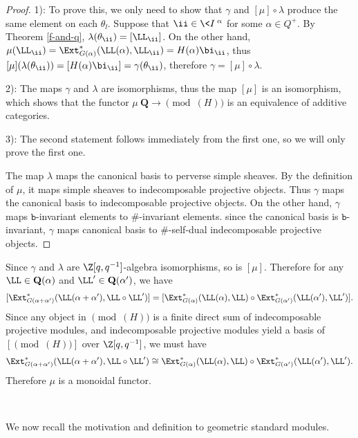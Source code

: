 \begin{proof}
    1): To prove this, we only need to show that $\gamma$ and $[\mu]\circ\lambda$ produce
    the same element on each $\theta_{\ii}$. Suppose that
    $\ii\in\<I\>^\alpha$ for some $\alpha\in Q^+$. By 
    Theorem \ref{f-and-q}, $\lambda(\theta_{\ii})
     = [\LL_{\ii}]$. On the other hand, $\mu(\LL_{\ii})
     = \Ext^*_{G(\alpha)}(\LL(\alpha),\LL_{\ii}) = H(\alpha)\bi_{\ii}$,
    thus $[\mu](\lambda(\theta_{\ii})) = [H(\alpha)\bi_{\ii}] = 
    \gamma(\theta_{\ii})$, therefore $\gamma = [\mu]\circ\lambda$.

    2): The maps $\gamma$ and $\lambda$ are isomorphisms,
    thus the map $[\mu]$ is an isomorphism, which shows that 
    the functor $\mu\:\mathbf{Q}\to\pmod(H)$ is an equivalence of additive categories.

    3): The second statement follows immediately from the first one,
    so we will only prove the first one.    

    The map $\lambda$ maps the canonical basis
    to perverse simple sheaves. By the definition of $\mu$,
    it maps simple sheaves to indecomposable projective objects.
    Thus $\gamma$ maps the canonical basis to indecomposable
    projective objects. On the other hand, $\gamma$ maps
    $\mathtt{b}$-invariant elements to $\#$-invariant elements.
    since the canonical basis is $\mathtt{b}$-invariant, $\gamma$
    maps canonical basis to $\#$-self-dual indecomposable
    projective objects.
\end{proof}

\begin{remark}
    Since $\gamma$ and $\lambda$ are $\Z[q,q^{-1}]$-algebra
    isomorphisms, so is $[\mu]$. Therefore for any $\LL\in
    \mathbf{Q}(\alpha)$ and $\LL'\in\mathbf{Q}(\alpha')$,
    we have $$[\Ext_{G(\alpha+\alpha')}^*(\LL(\alpha+\alpha'),\LL\circ\LL')]
     = [\Ext_{G(\alpha)}^*(\LL(\alpha),\LL)\circ\Ext_{G(\alpha')}^*(\LL(\alpha'),\LL')].$$
    Since any object in $\pmod(H)$ is a finite direct sum
    of indecomposable projective modules, and 
    indecomposable projective modules yield a basis
    of $[\pmod(H)]$ over $\Z[q,q^{-1}]$, we must have
    \[
        \Ext_{G(\alpha+\alpha')}^*(\LL(\alpha+\alpha'),\LL\circ\LL')
        \cong\Ext_{G(\alpha)}^*(\LL(\alpha),\LL)\circ\Ext_{G(\alpha')}^*(\LL(\alpha'),\LL').
    \]
    Therefore $\mu$ is a monoidal functor.
\end{remark}

\ 

We now recall the motivation and definition to geometric standard modules.

